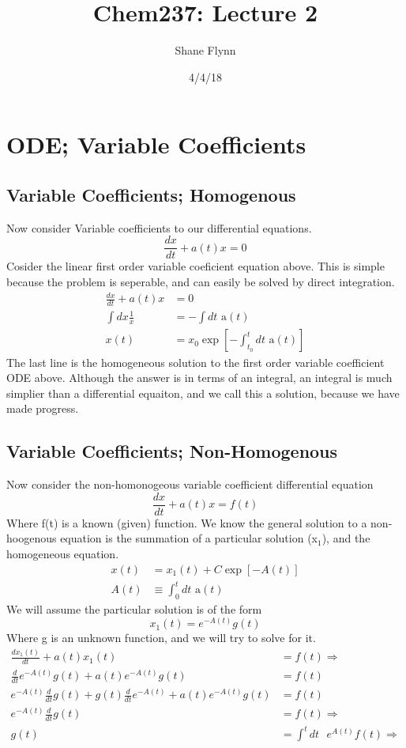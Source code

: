 \documentclass{article}
\title{Chem237: Lecture 2}
\date{4/4/18}
\author{Shane Flynn}
\newcommand{\be}{\begin{equation}}
\newcommand{\ee}{\end{equation}}
\begin{document}
\maketitle
\section*{ODE; Variable Coefficients}
\subsection*{Variable Coefficients; Homogenous}
Now consider Variable coefficients to our differential equations. 
\be
\frac{dx}{dt} + a(t) x = 0
\ee
Cosider the linear first order variable coeficient equation above.
This is simple because the problem is seperable, and can easily be solved by direct integration. 
\be
\begin{split}
    \frac{dx}{dt} + a(t) x &= 0 \\
    \int dx \frac{1}{x} &= -\int dt \text{ a}(t) \\
    x(t) &= x_0 \exp\left[-\int_{t_0}^t dt \text{ a}(t)\right]
\end{split}
\ee
The last line is the homogeneous solution to the first order variable coefficient ODE above. 
Although the answer is in terms of an integral, an integral is much simplier than a differential equaiton, and we call this a solution, because we have made progress. 

\subsection*{Variable Coefficients; Non-Homogenous}
Now consider the non-homonogeous variable coefficient differential equation
\be
\frac{dx}{dt} + a(t) x = f(t)
\ee
Where f(t) is a known (given) function. 
We know the general solution to a non-hoogenous equation is the summation of a particular solution (x$_1$), and the homogeneous equation.
\be
\begin{split}
    x(t) &= x_1(t) + C\exp\left[ -A(t) \right]\\
    A(t) & \equiv \int_0^t dt \text{ a}(t)
\end{split}
\ee
We will assume the particular solution is of the form
\be
x_1(t) = e^{-A(t)}g(t)
\ee
Where g is an unknown function, and we will try to solve for it.
\be
\begin{split}
    \frac{dx_1(t)}{dt} + a(t) x_1(t) &= f(t) \Rightarrow \\
    \frac{d}{dt} e^{-A(t)}g(t) + a(t)  e^{-A(t)}g(t) &= f(t)\\
    e^{-A(t)} \frac{d}{dt} g(t) + g(t) \frac{d}{dt} e^{-A(t)} + a(t)  e^{-A(t)}g(t) &= f(t)\\
    e^{-A(t)} \frac{d}{dt} g(t) &= f(t) \Rightarrow \\
    g(t) &= \int^t dt \text{ }e^{A(t)} f(t) \Rightarrow \\
\end{split}
\ee
\end{document}
